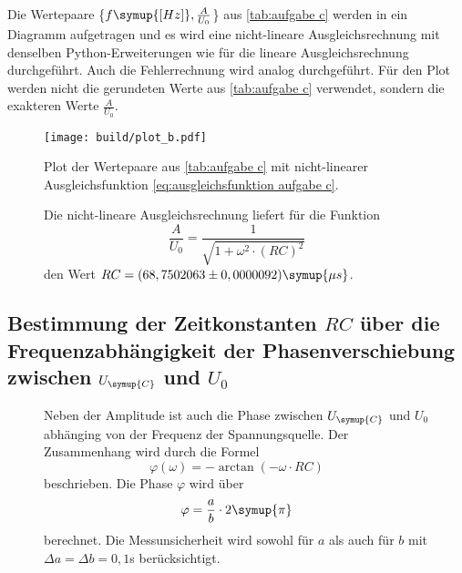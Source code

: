 Die Wertepaare \{$f \symup{[Hz]}, \frac{A}{U_{0}}$\} aus \autoref{tab:aufgabe c} werden in ein Diagramm aufgetragen
und es wird eine nicht-lineare Ausgleichsrechnung mit denselben Python-Erweiterungen wie für die lineare Ausgleichsrechnung
durchgeführt. Auch die Fehlerrechnung wird analog durchgeführt. Für den Plot werden nicht die
gerundeten Werte aus \autoref{tab:aufgabe c} verwendet, sondern die exakteren Werte $\frac{A}{U_{0}}$.

\begin{figure}
  \centering
  \texttt{[image: build/plot\_b.pdf]}
  \caption{Plot der Wertepaare aus \autoref{tab:aufgabe c} mit nicht-linearer Ausgleichsfunktion \autoref{eq:ausgleichsfunktion aufgabe c}.}
  \label{fig:plot_b}
\end{figure}

\begin{figure}[H]
Die nicht-lineare Ausgleichsrechnung liefert für die Funktion 
  \begin{equation}
    \frac{A}{U_{0}} = \frac{1}{\sqrt{1+{\omega}^{2}\cdot (RC)^2}}
    \label{eq:ausgleichsfunktion aufgabe c}
  \end{equation}
den Wert $RC = (68,7502063\pm0,0000092)\symup{\mu s}$.
\end{figure}



\subsection{Bestimmung der Zeitkonstanten $RC$ über die Frequenzabhängigkeit der Phasenverschiebung%
 zwischen $U_{\symup{C}}$ und $U_{0}$}
 \begin{figure}[H]
  Neben der Amplitude ist auch die Phase zwischen $U_{\symup{C}}$ und $U_{0}$ abhänging von der Frequenz der Spannungsquelle.
  Der Zusammenhang wird durch die Formel
  \begin{equation}
    \varphi(\omega) = -\arctan(-\omega \cdot RC)
    \label{eq:Formel für Phasenverschiebung}
  \end{equation}
  beschrieben. 
 Die Phase $\varphi$ wird über
 \begin{equation}
   \varphi = \frac{a}{b}\cdot 2\symup{\pi}
 \end{equation}
 berechnet. Die Messunsicherheit wird sowohl für $a$ als auch für $b$ mit $\Delta a = \Delta b = 0,1$s berücksichtigt.
 \end{figure}
 
